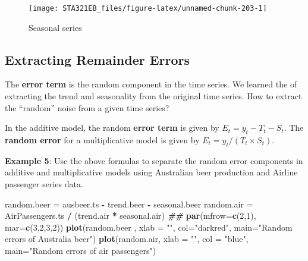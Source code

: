 \documentclass[
]{book}
\newenvironment{Shaded}{\begin{snugshade}}{\end{snugshade}}
\newcommand{\AttributeTok}[1]{\textcolor[rgb]{0.13,0.29,0.53}{#1}}
\newcommand{\DecValTok}[1]{\textcolor[rgb]{0.00,0.00,0.81}{#1}}
\newcommand{\DocumentationTok}[1]{\textcolor[rgb]{0.56,0.35,0.01}{\textbf{\textit{#1}}}}
\newcommand{\FunctionTok}[1]{\textcolor[rgb]{0.13,0.29,0.53}{\textbf{#1}}}
\newcommand{\NormalTok}[1]{#1}
\newcommand{\OtherTok}[1]{\textcolor[rgb]{0.56,0.35,0.01}{#1}}
\newcommand{\SpecialCharTok}[1]{\textcolor[rgb]{0.81,0.36,0.00}{\textbf{#1}}}
\newcommand{\StringTok}[1]{\textcolor[rgb]{0.31,0.60,0.02}{#1}}
\begin{document}
\begin{figure}

{\centering \texttt{[image: STA321EB\_files/figure-latex/unnamed-chunk-203-1]} 

}

\caption{Seasonal series}\label{fig:unnamed-chunk-203}
\end{figure}

\hypertarget{extracting-remainder-errors}{%
\subsection{Extracting Remainder Errors}\label{extracting-remainder-errors}}

The \textbf{error term} is the random component in the time series. We learned the of extracting the trend and seasonality from the original time series. How to extract the ``random'' noise from a given time series?

In the additive model, the random \textbf{error term} is given by \(E_t = y_t - T_t -S_t\). The \textbf{random error} for a multiplicative model is given by \(E_t = y_t/(T_t \times S_t)\).

\textbf{Example 5}: Use the above formulas to separate the random error components in additive and multiplicative models using Australian beer production and Airline passenger series data.

\begin{Shaded}
\begin{Highlighting}[]
\NormalTok{random.beer }\OtherTok{=}\NormalTok{ ausbeer.ts }\SpecialCharTok{{-}}\NormalTok{ trend.beer }\SpecialCharTok{{-}}\NormalTok{ seasonal.beer}
\NormalTok{random.air }\OtherTok{=}\NormalTok{ AirPassengers.ts }\SpecialCharTok{/}\NormalTok{ (trend.air }\SpecialCharTok{*}\NormalTok{ seasonal.air)}
\DocumentationTok{\#\#}
\FunctionTok{par}\NormalTok{(}\AttributeTok{mfrow=}\FunctionTok{c}\NormalTok{(}\DecValTok{2}\NormalTok{,}\DecValTok{1}\NormalTok{), }\AttributeTok{mar=}\FunctionTok{c}\NormalTok{(}\DecValTok{3}\NormalTok{,}\DecValTok{2}\NormalTok{,}\DecValTok{3}\NormalTok{,}\DecValTok{2}\NormalTok{))}
\FunctionTok{plot}\NormalTok{(random.beer , }\AttributeTok{xlab =} \StringTok{""}\NormalTok{, }\AttributeTok{col=}\StringTok{"darkred"}\NormalTok{, }\AttributeTok{main=}\StringTok{"Random errors of Australia beer"}\NormalTok{)}
\FunctionTok{plot}\NormalTok{(random.air, }\AttributeTok{xlab =} \StringTok{""}\NormalTok{, }\AttributeTok{col =} \StringTok{"blue"}\NormalTok{, }\AttributeTok{main=}\StringTok{"Random errors of air passengers"}\NormalTok{)}
\end{Highlighting}
\end{Shaded}
\end{document}
